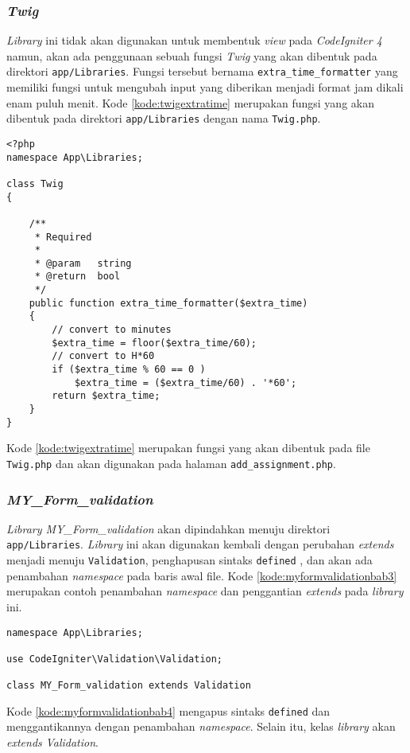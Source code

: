 \subsubsection{\textit{Twig}}
\textit{Library} ini tidak akan digunakan untuk membentuk \textit{view} pada \textit{CodeIgniter 4} namun, akan ada penggunaan sebuah fungsi \textit{Twig} yang akan dibentuk pada direktori \texttt{app/Libraries}. Fungsi tersebut bernama \texttt{extra\_time\_formatter} yang memiliki fungsi untuk mengubah input yang diberikan menjadi format jam dikali enam puluh menit. Kode \ref{kode:twigextratime} merupakan fungsi yang akan dibentuk pada direktori \texttt{app/Libraries} dengan nama \texttt{Twig.php}.
\begin{lstlisting}[caption=Perancangan perubahan \textit{library MY\_Form\_validation} pada \textit{CodeIgniter 4}, label=kode:twigextratime]
<?php
namespace App\Libraries;

class Twig
{

	/**
	 * Required
	 *
	 * @param	string
	 * @return	bool
	 */
	public function extra_time_formatter($extra_time)
	{
		// convert to minutes
		$extra_time = floor($extra_time/60);
		// convert to H*60
		if ($extra_time % 60 == 0 )
			$extra_time = ($extra_time/60) . '*60';
		return $extra_time;
	}
}

\end{lstlisting}

Kode \ref{kode:twigextratime} merupakan fungsi yang akan dibentuk pada file \texttt{Twig.php} dan akan digunakan pada halaman \texttt{add\_assignment.php}.

\subsubsection{\textit{MY\_Form\_validation}}
\textit{Library MY\_Form\_validation} akan dipindahkan menuju direktori \texttt{app/Libraries}. \textit{Library} ini akan digunakan kembali dengan perubahan \textit{extends} menjadi menuju \texttt{Validation}, penghapusan sintaks \texttt{defined} , dan akan ada penambahan \textit{namespace} pada baris awal file. Kode \ref{kode:myformvalidationbab3} merupakan contoh penambahan \textit{namespace} dan penggantian \textit{extends} pada \textit{library} ini.
\begin{lstlisting}[caption=Contoh perubahan \textit{library MY\_Form\_validation} pada \textit{CodeIgniter 4}, label=kode:myformvalidationbab4]
namespace App\Libraries;

use CodeIgniter\Validation\Validation;

class MY_Form_validation extends Validation
\end{lstlisting}
Kode \ref{kode:myformvalidationbab4} mengapus sintaks \texttt{defined} dan menggantikannya dengan penambahan \textit{namespace}. Selain itu, kelas \textit{library} akan \textit{extends} \textit{Validation}. 

